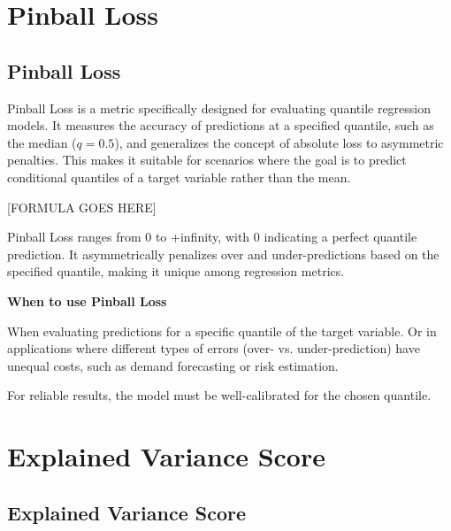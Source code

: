 \clearpage
\thispagestyle{regressionstyle}
\section{Pinball Loss}
\subsection{Pinball Loss }

Pinball Loss is a metric specifically designed for evaluating quantile regression models. It measures the accuracy of predictions at a specified quantile, such as the median ($q=0.5$),
and generalizes the concept of absolute loss to asymmetric penalties. This makes it suitable for scenarios where the goal is to predict conditional quantiles of a target variable
rather than the mean.

\begin{center}
    [FORMULA GOES HERE]
\end{center}

Pinball Loss ranges from 0 to +infinity, with 0 indicating a perfect quantile prediction. It asymmetrically penalizes over and under-predictions based on the specified quantile,
making it unique among regression metrics.

\textbf{When to use Pinball Loss}

When evaluating predictions for a specific quantile of the target variable. Or in applications where different types of errors (over- vs. under-prediction) 
have unequal costs, such as demand forecasting or risk estimation.

{
    \item For reliable results, the model must be well-calibrated for the chosen quantile.
}

\clearpage
\thispagestyle{regressionstyle}
\section{Explained Variance Score}
\subsection{Explained Variance Score}

